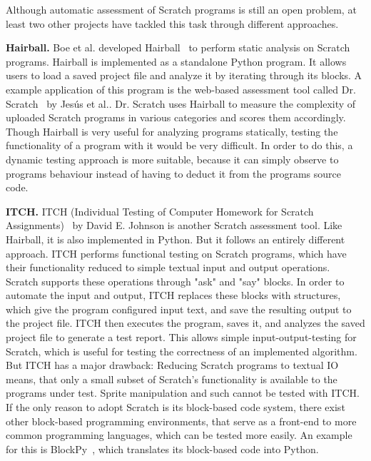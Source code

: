 Although automatic assessment of Scratch programs is still an open problem,
at least two other projects have tackled this task through different approaches.
\parspace

\textbf{Hairball.}
Boe et al. developed Hairball~\cite{hairball} to perform static analysis on Scratch programs.
Hairball is implemented as a standalone Python program.
It allows users to load a saved project file and analyze it by iterating through its blocks.
A example application of this program is the web-based assessment tool called Dr. Scratch~\cite{drscratch} by Jes\'{u}s et al..
Dr. Scratch uses Hairball to measure the complexity of uploaded Scratch programs in various categories and scores them accordingly.
Though Hairball is very useful for analyzing programs statically, testing the functionality of a program with it would be very difficult.
In order to do this, a dynamic testing approach is more suitable, because it can simply observe to programs behaviour instead of having to deduct it from the programs source code.
\parspace

\textbf{ITCH.}
ITCH (Individual Testing of Computer Homework for Scratch Assignments)~\cite{itch} by David E. Johnson is another Scratch assessment tool.
Like Hairball, it is also implemented in Python.
But it follows an entirely different approach.
ITCH performs functional testing on Scratch programs, which have their functionality reduced to simple textual input and output operations.
Scratch supports these operations through "ask" and "say" blocks.
In order to automate the input and output, ITCH replaces these blocks with structures, which give the program configured input text, and save the resulting output to the project file.
ITCH then executes the program, saves it, and analyzes the saved project file to generate a test report.
This allows simple input-output-testing for Scratch, which is useful for testing the correctness of an implemented algorithm.
But ITCH has a major drawback: Reducing Scratch programs to textual IO means, that only a small subset of Scratch's functionality is available to the programs under test.
Sprite manipulation and such cannot be tested with ITCH.
If the only reason to adopt Scratch is its block-based code system, there exist other block-based programming environments, that serve as a front-end to more common programming languages, which can be tested more easily.
An example for this is BlockPy~\cite{blockpy}, which translates its block-based code into Python.

